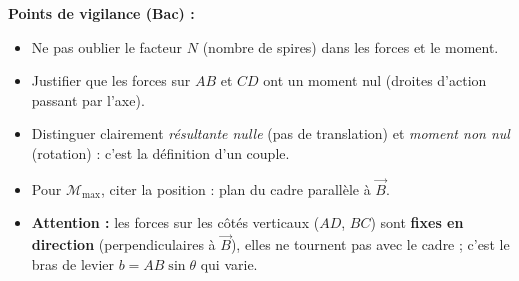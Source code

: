 \documentclass[11pt]{article}
\begin{document}
\begin{corrige}
\textbf{Points de vigilance (Bac) :}
\begin{itemize}
\item Ne pas oublier le facteur $N$ (nombre de spires) dans les forces et le moment.
\item Justifier que les forces sur $AB$ et $CD$ ont un moment nul (droites d'action passant par l'axe).
\item Distinguer clairement \emph{résultante nulle} (pas de translation) et \emph{moment non nul} (rotation) : c'est la définition d'un couple.
\item Pour $\mathcal{M}_{\max}$, citer la position : plan du cadre parallèle à $\vec{B}$.
\item \textbf{Attention :} les forces sur les côtés verticaux ($AD$, $BC$) sont \textbf{fixes en direction} (perpendiculaires à $\vec{B}$), elles ne tournent pas avec le cadre ; c'est le bras de levier $b = AB\sin\theta$ qui varie.
\end{itemize}
\end{corrige}
\end{document}
